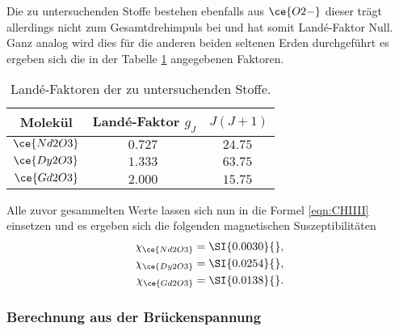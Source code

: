 Die zu untersuchenden Stoffe bestehen ebenfalls aus $\ce{O2-}$ dieser trägt allerdings nicht zum Gesamtdrehimpuls bei und hat somit Landé-Faktor Null.
Ganz analog wird dies für die anderen beiden seltenen Erden durchgeführt es ergeben sich die in der Tabelle \ref{tab:lande} angegebenen Faktoren.
\begin{table}
    \caption{Landé-Faktoren der zu untersuchenden Stoffe.}
    \centering
    \label{tab:lande}
    \begin{tabular}{c | c c}
        \toprule
        Molekül & Landé-Faktor $g_J$ & $J(J+1)$ \\
        \midrule
        $\ce{Nd2O3}$ & $\SI{0.727}{}$     & $\SI{24.75}{}$\\
        $\ce{Dy2O3}$ & $\SI{1.333}{}$    & $\SI{63.75}{}$\\
        $\ce{Gd2O3}$ & $\SI{2.000}{}$    & $\SI{15.75}{}$\\
        \bottomrule    
    \end{tabular}
\end{table}
Alle zuvor gesammelten Werte lassen sich nun in die Formel \eqref{eqn:CHIIII} einsetzen und es ergeben sich die folgenden magnetischen Suszeptibilitäten
\begin{align*}
\chi_{\ce{Nd2O3}} &= \SI{0.0030}{},\\
\chi_{\ce{Dy2O3}} &= \SI{0.0254}{},\\
\chi_{\ce{Gd2O3}} &= \SI{0.0138}{}.
\end{align*}

\subsubsection{Berechnung aus der Brückenspannung}

